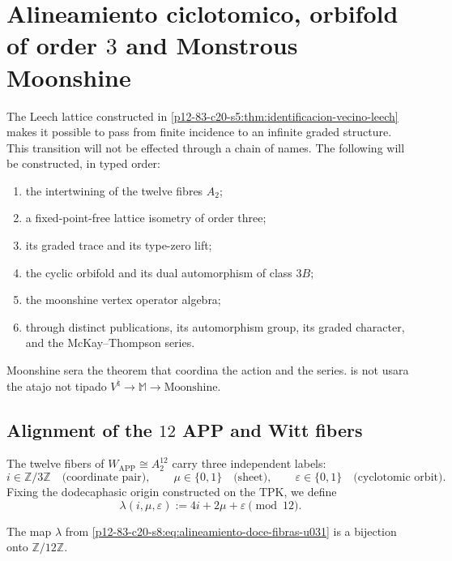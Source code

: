 \section{Alineamiento ciclotomico, orbifold of order \(3\) and Monstrous Moonshine}
\label{p12-83-c20-s8:chap:alineamiento-orbifold-moonshine}

The Leech lattice constructed in
\cref{p12-83-c20-s5:thm:identificacion-vecino-leech} makes it possible to pass from finite incidence
to an infinite graded structure. This transition will not be effected
through a chain of names. The following will be constructed, in typed order:
\begin{enumerate}
 \item the intertwining of the twelve fibres \(A_2\);
 \item a fixed-point-free lattice isometry of order three;
 \item its graded trace and its type-zero lift;
 \item the cyclic orbifold and its dual automorphism of class \(3B\);
 \item the moonshine vertex operator algebra;
 \item through distinct publications, its automorphism group, its graded
       character, and the McKay--Thompson series.
\end{enumerate}
Moonshine sera the theorem that coordina the action and the series. is not usara
the atajo not tipado
\(V^\natural\to\mathbb M\to\text{Moonshine}\).

\subsection{Alignment of the \(12\) APP and Witt fibers}

The twelve fibers of \(W_{\mathrm{APP}}\cong A_2^{12}\) carry three
independent labels:
\[
 i\in\mathbb Z/3\mathbb Z
 \quad\text{(coordinate pair)},\qquad
 \mu\in\{0,1\}
 \quad\text{(sheet)},\qquad
 \varepsilon\in\{0,1\}
 \quad\text{(cyclotomic orbit)}.
\]
Fixing the dodecaphasic origin constructed on the TPK, we define
\begin{equation}
 \lambda(i,\mu,\varepsilon)
 :=4i+2\mu+\varepsilon\pmod{12}.
 \label{p12-83-c20-s8:eq:alineamiento-doce-fibras-u031}
\end{equation}

\begin{lemma}
\label{p12-83-c20-s8:lem:biyectividad-alineamiento-u031}
The map \(\lambda\) from
\eqref{p12-83-c20-s8:eq:alineamiento-doce-fibras-u031} is a bijection onto
\(\mathbb Z/12\mathbb Z\).
\end{lemma}

